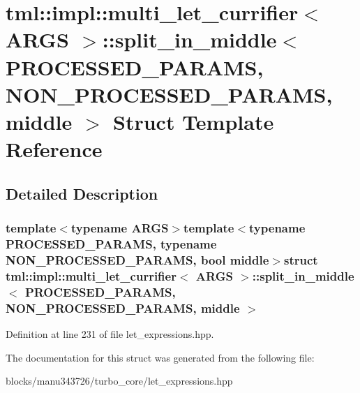 \hypertarget{structtml_1_1impl_1_1multi__let__currifier_1_1split__in__middle}{\section{tml\+:\+:impl\+:\+:multi\+\_\+let\+\_\+currifier$<$ A\+R\+G\+S $>$\+:\+:split\+\_\+in\+\_\+middle$<$ P\+R\+O\+C\+E\+S\+S\+E\+D\+\_\+\+P\+A\+R\+A\+M\+S, N\+O\+N\+\_\+\+P\+R\+O\+C\+E\+S\+S\+E\+D\+\_\+\+P\+A\+R\+A\+M\+S, middle $>$ Struct Template Reference}
\label{structtml_1_1impl_1_1multi__let__currifier_1_1split__in__middle}
}


\subsection{Detailed Description}
\subsubsection*{template$<$typename A\+R\+G\+S$>$template$<$typename P\+R\+O\+C\+E\+S\+S\+E\+D\+\_\+\+P\+A\+R\+A\+M\+S, typename N\+O\+N\+\_\+\+P\+R\+O\+C\+E\+S\+S\+E\+D\+\_\+\+P\+A\+R\+A\+M\+S, bool middle$>$struct tml\+::impl\+::multi\+\_\+let\+\_\+currifier$<$ A\+R\+G\+S $>$\+::split\+\_\+in\+\_\+middle$<$ P\+R\+O\+C\+E\+S\+S\+E\+D\+\_\+\+P\+A\+R\+A\+M\+S, N\+O\+N\+\_\+\+P\+R\+O\+C\+E\+S\+S\+E\+D\+\_\+\+P\+A\+R\+A\+M\+S, middle $>$}



Definition at line 231 of file let\+\_\+expressions.\+hpp.



The documentation for this struct was generated from the following file\+:\begin{DoxyCompactItemize}
\item 
blocks/manu343726/turbo\+\_\+core/let\+\_\+expressions.\+hpp\end{DoxyCompactItemize}
